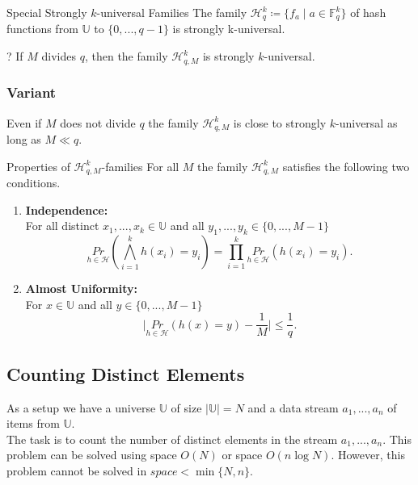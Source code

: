 \documentclass[english]{panikzettel}
\begin{document}
\begin{halfboxl}
\vspace{-\baselineskip}
	\begin{theo}{Special Strongly $k$-universal Families}
	The family $\mathcal{H}_q^k\coloneqq \{f_a\mid a\in \mathbb{F}_q^k \}$ of hash functions from $\mathbb{U}$ to $\{0,...,q-1 \}$ is strongly k-universal.
	\end{theo}
\end{halfboxl}
\begin{halfboxr}
\vspace{-\baselineskip}
	\begin{theo}{?}
	If $M$ divides $q$, then the family $\mathcal{H}_{q,M}^k$ is strongly $k$-universal.
	\end{theo}
\end{halfboxr}

\subsubsection{Variant}
Even if $M$ does not divide $q$ the family $\mathcal{H}_{q,M}^k$ is close to strongly $k$-universal as long as $M\ll q$.

\begin{theo}{Properties of $\mathcal{H}_{q,M}^k$-families}
For all $M$ the family $\mathcal{H}_{q,M}^k$ satisfies the following two conditions.
\begin{enumerate}
\item \textbf{Independence:}\\
For all distinct $x_1,...,x_k\in\mathbb{U}$ and all $y_1,...,y_k\in\{0,...,M-1 \}$
\[
\underset{h\in\mathcal{H}}{Pr}\left( \bigwedge_{i=1}^k h(x_i)=y_i \right) = \prod_{i=1}^k \underset{h\in\mathcal{H}}{Pr}(h(x_i)=y_i).
\]
\item \textbf{Almost Uniformity:}\\ For $x\in\mathbb{U}$ and all $y\in\{0,...,M-1 \}$
\[
\bigg|\underset{h\in\mathcal{H}}{Pr} (h(x)=y)-\frac{1}{M}\bigg|\leq \frac{1}{q}.
\]
\end{enumerate}
\end{theo}



\subsection{Counting Distinct Elements}
As a setup we have a universe $\mathbb{U}$ of size $|\mathbb{U}|=N$ and a data stream $a_1,...,a_n$ of items from $\mathbb{U}$.\\
The task is to count the number of distinct elements in the stream $a_1,...,a_n$. This problem can be solved using space $O(N)$ or space $O(n\log N)$. However, this problem cannot be solved in $space < \min\{N,n \}.$
\end{document}
